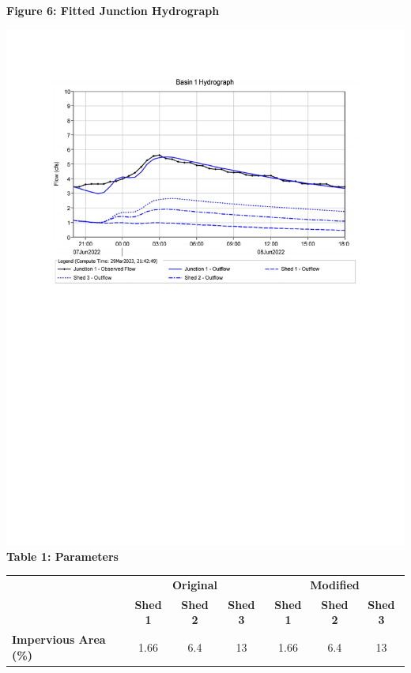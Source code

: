 \documentclass{article}
\begin{document}
\begin{center}
{\large{\bf Figure 6: Fitted Junction Hydrograph\\}}
\includegraphics*[scale=0.7, trim = {0 14cm 0 3.1cm}]{results/Basin_1_Hydrograph.pdf}
{\large{\bf \\Table 1: Parameters\\}}
\vspace{3mm}
\begin{tabular}{|l|ccc|ccc|}
    \hline
    & \multicolumn{3}{c|}{\textbf{Original}}              & \multicolumn{3}{c|}{\textbf{Modified}}                \\
    & \textbf{Shed 1} & \textbf{Shed 2} & \textbf{Shed 3} & \textbf{Shed 1} & \textbf{Shed 2} & \textbf{Shed 3}  \\ 
    \hline
    \textbf{Impervious Area (\%)}        & 1.66            & 6.4             & 13              & 1.66            & 6.4             & 13               \\

\end{tabular}
\end{center}
\end{document}
